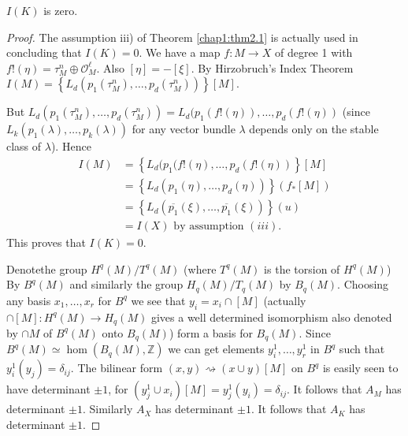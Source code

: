 \begin{lemma}\label{chap1:lem5.3}%
$I(K)$ is zero.
\end{lemma}

\begin{proof}
The assumption iii) of Theorem \ref{chap1:thm2.1} is actually used in
concluding that 
$I(K) = 0$. We have a map $f: M \to X$ of degree 1 with $f! (\eta
) = \tau^n_M \oplus \mathscr{O}^\ell_M$. Also $[\eta] = - [\xi]$. By
Hirzobruch's Index Theorem $I(M) = \left\{L_d (p_1 (\tau^n _M),
\ldots, p_d(\tau^n_M))\right\}[M]$. 

 But $L_d (p_1 (\tau^n_M), \ldots, p_d (\tau^n_M)) = L_d (p_1
 (f!(\eta)), \ldots, p_d (f! (\eta))$ (since\break $L_k (p_1(\lambda
 ),\ldots, p_k (\lambda))$ for any vector bundle $\lambda $ depends
 only on the stable class of $\lambda$). Hence  
\begin{align*}
I(M) & = \left\{L_d (p_1(f! (\eta ), \ldots, p_d (f!(\eta ))\right\}[M]\\
& = \left\{ L_d (p_1 (\eta ),\ldots, p_d (\eta))\right\}(f_*[M])\\
& = \left\{ L_d (\overline{p_1} (\xi), \ldots, \overline{p_1}(\xi))
\right\}(u)\\ 
& = I(X) \text{ by assumption } (iii).
\end{align*}
This proves that $I(K) = 0$.

Denote\pageoriginale the group $H^q (M)/ T^q (M)$ (where $T^q (M)$ is
the torsion of $H^q (M)$) By $B^q(M)$ and similarly the group $H_q
(M)/ T_q (M)$ by $B_q (M)$. Choosing any basis $x_1, \ldots, x_r $ for
$B^q$ we see that $y_i = x_i \cap [M]$ (actually $\cap [M]: H^q (M)
\to H_q (M)$ gives a well determined isomorphism also denoted by $\cap
M$ of $B^q 
(M)$ onto $B_q (M)$) form a basis for $B_q (M)$. Since $B^q (M) \simeq
\hom (B_q (M), \mathbb{Z})$ we can get elements $y^1_i, \ldots, y^1_r$
in $B^q$ such that $y^1_i (y_j) = \delta_{ij}$. The bilinear form $(x,
y) \rightsquigarrow (x \cup y) [M]$ on $B^q$ is easily seen to have
determinant $\pm 1$, for $(y^1_j \cup x_i )[M] = y^1_j (y_i) =
\delta_{ij}$. It follows that $A_M$ has determinant $\pm 1$. Similarly
$A_X$ has determinant $\pm 1$. It follows that $A_K$ has determinant
$\pm 1$. 
\end{proof}

